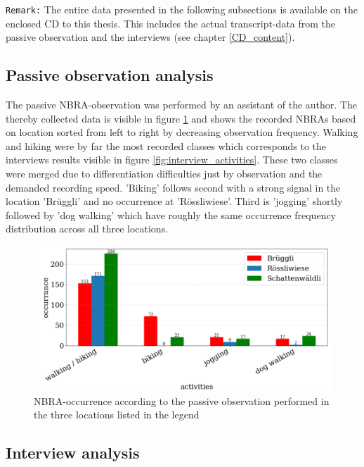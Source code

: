 \newline

\texttt{Remark:} The entire data presented in the following subsections is available on the enclosed CD to this thesis. This includes the actual transcript-data from the passive observation and the interviews (see chapter \ref{CD_content}).

\subsection{Passive observation analysis}
The passive NBRA-observation was performed by an assistant of the author. The thereby collected data is visible in figure \ref{fig:passive_observation} and shows the recorded NBRAs based on location sorted from left to right by decreasing observation frequency. Walking and hiking were by far the most recorded classes which corresponds to the interviews results visible in figure \ref{fig:interview_activities}. These two classes were merged due to differentiation difficulties just by observation and the demanded recording speed. 'Biking' follows second with a strong signal in the location 'Br\"uggli' and no occurrence at 'R\"ossliwiese'. Third is 'jogging' shortly followed by 'dog walking' which have roughly the same occurrence frequency distribution across all three locations.

\begin{figure}[h!]
   \centering
   \includegraphics[width=\textwidth]{img/passive_observations.pdf}
   \caption{NBRA-occurrence according to the passive observation performed in the three locations listed in the legend}
   \label{fig:passive_observation}
\end{figure}

\subsection{Interview analysis}

